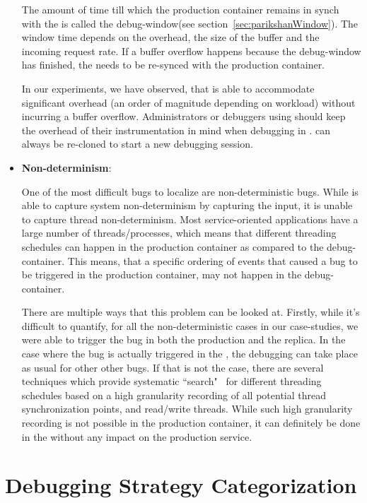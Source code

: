 \begin{itemize}
	The amount of time till which the production container remains in synch with the \debugcontainer is called the debug-window(see section~\ref{sec:parikshanWindow}). 
	The window time depends on the overhead, the size of the buffer and the incoming request rate. 
	If a buffer overflow happens because the debug-window has finished, the \debugcontainer needs to be re-synced with the production container.
	
	In our experiments, we have observed, that \parikshan is able to accommodate significant overhead (an order of magnitude depending on workload) without incurring a buffer overflow.	
	Administrators or debuggers using \parikshan should keep the overhead of their instrumentation in mind when debugging in \parikshan. 
	\productioncontainer can always be re-cloned to start a new debugging session.
	
	\item \textbf{Non-determinism}:
	
	One of the most difficult bugs to localize are non-deterministic bugs. While \parikshan is able to capture system non-determinism by capturing the input, it is unable to capture thread non-determinism. 
	Most service-oriented applications have a large number of threads/processes, which means that different threading schedules can happen in the production container as compared to the debug-container.
	This means, that a specific ordering of events that caused a bug to be triggered in the production container, may not happen in the debug-container.
	
	There are multiple ways that this problem can be looked at. 
	Firstly, while it's difficult to quantify, for all the non-deterministic cases in our case-studies, we were able to trigger the bug in both the production and the replica. 
	In the case where the bug is actually triggered in the \debugcontainer, the debugging can take place as usual for other other bugs.
	If that is not the case, there are several techniques which provide systematic ``search"~\cite{pres,best} for different threading schedules based on a high granularity recording of all potential thread synchronization points, and read/write threads. 
	While such high granularity recording is not possible in the production container, it can definitely be done in the \debugcontainer without any impact on the production service.
	
\end{itemize}

\section{Debugging Strategy Categorization}
\label{sec:activeDebuggingScenarios}

